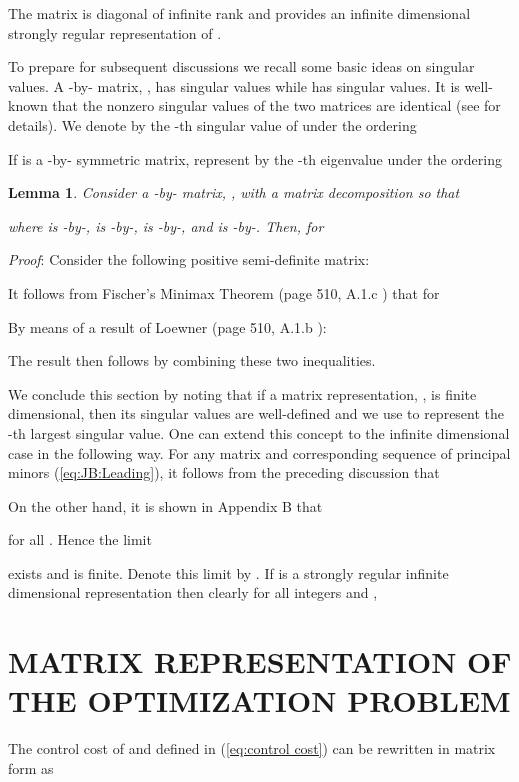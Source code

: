 \documentclass[12pt,onecolumn,draftcls]{IEEEtran}
\newtheorem{lemma}{Lemma}[section]
\begin{document}
The matrix is diagonal of infinite rank and provides an infinite dimensional strongly regular representation of .  

To prepare for subsequent discussions
we recall some basic ideas on singular values.   A -by- matrix, 
, has  singular values while  has  singular values.  It is well-known that the nonzero singular
values of the two matrices are identical (see \cite{mo} for details).
We denote by  the -th singular value of 
under the ordering

If  is a -by- symmetric matrix, represent by  the -th eigenvalue under the ordering


\begin{lemma}
Consider a -by- matrix, , with a matrix decomposition so that

where  is -by-,
 is -by-,  is -by-,
and  is -by-.  Then, for 

\end{lemma}

\noindent
\textit{Proof}:  Consider the following positive semi-definite matrix:

It follows from Fischer's Minimax Theorem (page 510, A.1.c \cite{mo}) that for


By means of a result of Loewner (page 510, A.1.b \cite{mo}):

The result then follows by combining these two inequalities.   \hfill 

We conclude this section by noting that if a matrix representation, , is
finite dimensional, then its singular values are well-defined and we use
 to represent the -th largest singular value.
One can extend this concept to the infinite dimensional case in the following way.
For any matrix  and corresponding sequence of principal minors  (\ref{eq:JB:Leading}), it follows from the preceding discussion that 

On the other hand, it is shown in Appendix B that

for all .  Hence the limit

exists and is finite.  Denote this limit by .
If   is a strongly regular infinite dimensional representation then clearly
for all integers  and , 

\section{MATRIX REPRESENTATION OF THE OPTIMIZATION PROBLEM}\setcounter{equation}{0}

The control cost of  and  defined in (\ref{eq:control cost})
can be rewritten in matrix form as
\end{document}
